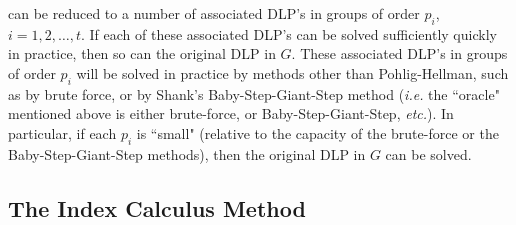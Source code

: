 \begin{itemize}
		can be reduced to a number of associated DLP's in groups of order $p_{i}$, $i = 1,2,\ldots,t$.
		If each of these associated DLP's can be solved sufficiently quickly in practice, then so can the original
		DLP in $G$.  These associated DLP's in groups of order $p_{i}$ will be solved in practice by methods other
		than Pohlig-Hellman, such as by brute force, or by Shank's Baby-Step-Giant-Step method
		(\textit{i.e.} the ``oracle" mentioned above is either brute-force, or Baby-Step-Giant-Step, \textit{etc.}).
		In particular, if each $p_{i}$ is ``small" (relative to the capacity of the brute-force or the Baby-Step-Giant-Step
		methods), then the original DLP in $G$ can be solved.
\end{itemize}

\subsection{The Index Calculus Method}



